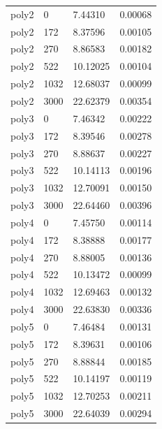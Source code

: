 \begin{longtable}{p{2.0cm} p{2.0cm} p{4.0cm} p{2.0cm}}
            poly2     & 0            & 7.44310          & 0.00068 \\
        poly2     & 172          & 8.37596          & 0.00105 \\
        poly2     & 270          & 8.86583          & 0.00182 \\
        poly2     & 522          & 10.12025         & 0.00104 \\
        poly2     & 1032         & 12.68037         & 0.00099 \\
        poly2     & 3000         & 22.62379         & 0.00354 \\
        \midrule
        poly3     & 0            & 7.46342          & 0.00222 \\
        poly3     & 172          & 8.39546          & 0.00278 \\
        poly3     & 270          & 8.88637          & 0.00227 \\
        poly3     & 522          & 10.14113         & 0.00196 \\
        poly3     & 1032         & 12.70091         & 0.00150 \\
        poly3     & 3000         & 22.64460         & 0.00396 \\
        \midrule
        poly4     & 0            & 7.45750          & 0.00114 \\
        poly4     & 172          & 8.38888          & 0.00177 \\
        poly4     & 270          & 8.88005          & 0.00136 \\
        poly4     & 522          & 10.13472         & 0.00099 \\
        poly4     & 1032         & 12.69463         & 0.00132 \\
        poly4     & 3000         & 22.63830         & 0.00336 \\
        \midrule
        poly5     & 0            & 7.46484          & 0.00131 \\
        poly5     & 172          & 8.39631          & 0.00106 \\
        poly5     & 270          & 8.88844          & 0.00185 \\
        poly5     & 522          & 10.14197         & 0.00119 \\
        poly5     & 1032         & 12.70253         & 0.00211 \\
        poly5     & 3000         & 22.64039         & 0.00294 \\

\end{longtable}
